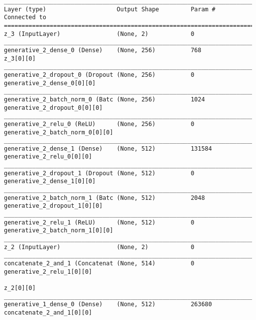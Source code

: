 \begin{lstlisting}[caption={CelebA-\ac{VLAE} Decoder},captionpos=b,basicstyle=\tiny, label={lst:celeba-vlae-decoder}]
__________________________________________________________________________________________________
Layer (type)                    Output Shape         Param #     Connected to
==================================================================================================
z_3 (InputLayer)                (None, 2)            0
__________________________________________________________________________________________________
generative_2_dense_0 (Dense)    (None, 256)          768         z_3[0][0]
__________________________________________________________________________________________________
generative_2_dropout_0 (Dropout (None, 256)          0           generative_2_dense_0[0][0]
__________________________________________________________________________________________________
generative_2_batch_norm_0 (Batc (None, 256)          1024        generative_2_dropout_0[0][0]
__________________________________________________________________________________________________
generative_2_relu_0 (ReLU)      (None, 256)          0           generative_2_batch_norm_0[0][0]
__________________________________________________________________________________________________
generative_2_dense_1 (Dense)    (None, 512)          131584      generative_2_relu_0[0][0]
__________________________________________________________________________________________________
generative_2_dropout_1 (Dropout (None, 512)          0           generative_2_dense_1[0][0]
__________________________________________________________________________________________________
generative_2_batch_norm_1 (Batc (None, 512)          2048        generative_2_dropout_1[0][0]
__________________________________________________________________________________________________
generative_2_relu_1 (ReLU)      (None, 512)          0           generative_2_batch_norm_1[0][0]
__________________________________________________________________________________________________
z_2 (InputLayer)                (None, 2)            0
__________________________________________________________________________________________________
concatenate_2_and_1 (Concatenat (None, 514)          0           generative_2_relu_1[0][0]
                                                                 z_2[0][0]
__________________________________________________________________________________________________
generative_1_dense_0 (Dense)    (None, 512)          263680      concatenate_2_and_1[0][0]

\end{lstlisting}
